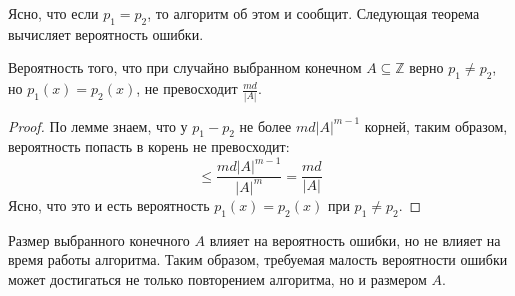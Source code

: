 Ясно, что если $p_1=p_2$, то алгоритм об этом и сообщит. Следующая теорема вычисляет вероятность ошибки. 
\begin{theorem*}
Вероятность того, что при случайно выбранном конечном $A\subseteq \mathbb Z$ верно $p_1 \neq p_2$, но $p_1(x) = p_2(x)$, не превосходит $\frac{md}{|A|}$.
\end{theorem*}
\begin{proof}
    По лемме знаем, что у $p_1-p_2$ не более $md|A|^{m-1}$ корней, таким образом, вероятность попасть в корень не превосходит: $$\leq \frac{md|A|^{m-1}}{|A|^m} = \frac{md}{|A|}$$ Ясно, что это и есть вероятность $p_1(x)=p_2(x)$ при $p_1 \neq p_2$. 
\end{proof}

 Размер выбранного конечного $A$ влияет на вероятность ошибки, но не влияет на время работы алгоритма. Таким образом, требуемая малость вероятности ошибки может достигаться не только повторением алгоритма, но и размером $A$.
